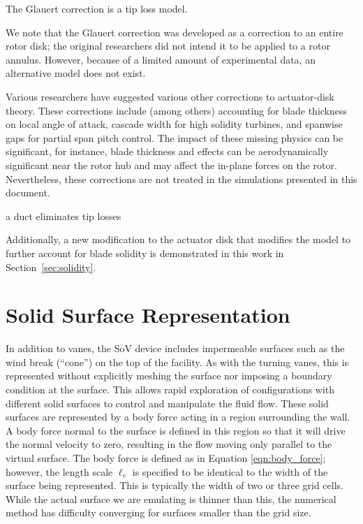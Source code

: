 The Glauert correction is a tip loss model.

We note that the Glauert correction was developed as a correction to an
entire rotor disk; the original researchers did not intend it to be
applied to a rotor annulus. However, because of a limited amount  of
experimental data, an alternative model does not exist.  

Various researchers\cite{Moriarty_aerodyntheory,wilson1978design} have
suggested various other corrections to actuator-disk theory. These
corrections include (among others) accounting for blade thickness on
local angle of attack, cascade width for high solidity turbines, and
spanwise gaps for partial span pitch control. The impact of these
missing physics can be significant, for instance, blade thickness and
effects can be aerodynamically significant near the rotor hub and may 
affect the in-plane forces on the rotor. Nevertheless,
these corrections are not treated in the simulations presented in this
document.  

a duct eliminates tip losses

Additionally, a new modification to the actuator disk that modifies the
model to further account for blade solidity is demonstrated in this work
in Section~\ref{sec:solidity}. 

\section{Solid Surface Representation}
\label{subsec:solid_surface}

In addition to vanes, the SoV device includes impermeable surfaces
such as the wind break (``cone'') on the top of the facility. As with
the turning vanes, this is represented without explicitly meshing the
surface nor imposing  a boundary condition at the surface. This allows
rapid exploration of configurations  with different solid surfaces to
control and manipulate the fluid flow. These solid surfaces are
represented by a body force acting in a region surrounding the wall. 
A body force normal to the surface is defined in this region so
that it will drive the normal velocity to zero, resulting in the flow
moving only parallel to the virtual surface. 
The body force is defined as in Equation
\ref{eqn:body_force}; however, the length scale $\ell_v$ is specified to
be identical to the width of the surface being represented. This is
typically the width of two or three grid cells. While the actual surface we are
emulating is thinner than this, the numerical method has difficulty
converging for surfaces smaller than the grid size.  


